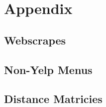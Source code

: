 \documentclass[11pt]{article}
\begin{document}
%
%
%
%
%

\newpage 



\section{Appendix}

\subsection{Webscrapes}

\subsection{Non-Yelp Menus}

\subsection{Distance Matricies}
\end{document}
